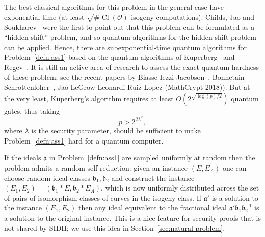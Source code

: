 \documentclass{llncs}
\newcommand{\OO}{\mathcal{O}}
\DeclareMathOperator{\Cl}{Cl}
\renewcommand{\a}{\mathfrak{a}}
\renewcommand{\b}{\mathfrak{b}}
\begin{document}
The best classical algorithms for this problem in the general case have exponential time (at least $\sqrt{ \# \Cl( \OO ) }$ isogeny computations).
Childs, Jao and Soukharev~\cite{childs2014constructing} were the first to point out that this problem can be formulated as a ``hidden shift'' problem, and so quantum algorithms for the hidden shift problem can be applied.
Hence, there are subexponential-time quantum algorithms for Problem~\ref{defn:ass1} based on the quantum algorithms of Kuperberg~\cite{Kup} and Regev~\cite{regev04}. 
It is still an active area of research to assess the exact quantum hardness of these problem; see the recent papers by Biasse-Iezzi-Jacobson~\cite{BIJ18}, Bonnetain-Schrottenloher~\cite{BS18}, Jao-LeGrow-Leonardi-Ruiz-Lopez (MathCrypt 2018)).
But at the very least, Kuperberg's algorithm requires at least $\tilde{O}( 2^{\sqrt{\log(p)/2}} )$ quantum gates, thus taking 
\begin{equation} \label{con1}
   p>2^{2\lambda^2},
\end{equation}
where $\lambda$ is the security parameter,
should be sufficient to make Problem~\ref{defn:ass1} hard for a quantum computer.


If the ideals $\a$ in Problem~\ref{defn:ass1} are sampled uniformly at random then the problem admits a random self-reduction: given an instance $(E, E_A)$ one can choose random ideal classes $\b_1, \b_2$ and construct the instance $(E_1, E_2) = (\b_1 * E, \b_2 * E_A )$, which is now uniformly distributed across the set of pairs of isomorphism classes of curves in the isogeny class.
If $\a'$ is a solution to the instance $(E_1, E_2)$ then any ideal equivalent to the fractional ideal $\a'\b_1 \b_2^{-1}$ is a solution to the original instance.
This is a nice feature for security proofs that is not shared by SIDH; we use this idea in Section~\ref{sec:natural-problem}.
\end{document}

